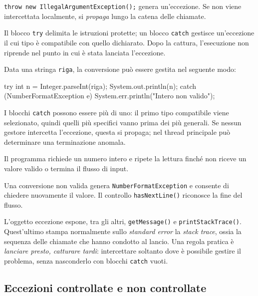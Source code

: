 \texttt{throw new IllegalArgumentException();} genera un'eccezione.
Se non viene intercettata localmente, si \emph{propaga} lungo la
catena delle chiamate.

\begin{definition}
\label{def:fi-java-file-try-catch}
Il blocco \texttt{try} delimita le istruzioni protette; un blocco
\texttt{catch} gestisce un'eccezione il cui tipo è compatibile
con quello dichiarato. Dopo la cattura, l'esecuzione non riprende
nel punto in cui è stata lanciata l'eccezione.
\end{definition}

Data una stringa \texttt{riga}, la conversione può essere
gestita nel seguente modo:

\begin{unipdcode}[language=Java]
try {
    int n = Integer.parseInt(riga);
    System.out.println(n);
} catch (NumberFormatException e) {
    System.err.println("Intero non valido");
}
\end{unipdcode}

I blocchi \texttt{catch} possono essere più di uno: il primo tipo
compatibile viene selezionato, quindi quelli più specifici vanno
prima dei più generali. Se nessun gestore intercetta l'eccezione,
questa si propaga; nel thread principale può determinare una
terminazione anomala.

\begin{example}
Il programma richiede un numero intero e ripete la lettura
finché non riceve un valore valido o termina il flusso di input.



Una conversione non valida genera \texttt{NumberFormatException}
e consente di chiedere nuovamente il valore. Il controllo
\texttt{hasNextLine()} riconosce la fine del flusso.
\end{example}

L'oggetto eccezione espone, tra gli altri, \texttt{getMessage()}
e \texttt{printStackTrace()}. Quest'ultimo stampa normalmente
sullo \emph{standard error} la \emph{stack trace}, ossia la
sequenza delle chiamate che hanno condotto al lancio.
Una regola pratica è \emph{lanciare presto, catturare tardi}:
intercettare soltanto dove è possibile gestire il problema,
senza nasconderlo con blocchi \texttt{catch} vuoti.

\subsection{Eccezioni controllate e non controllate}
\label{sec:fi-java-file-checked}

